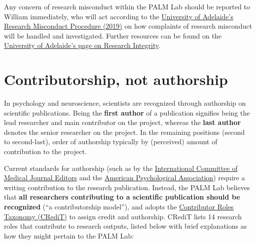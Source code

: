 \documentclass[
]{book}
\begin{document}
Any concern of research misconduct within the PALM Lab should be reported to William immediately, who will act according to the \href{https://www.adelaide.edu.au/policies/96/?dsn=policy.document;field=data;id=7885;m=view}{University of Adelaide's Research Misconduct Procedure (2019)} on how complaints of research misconduct will be handled and investigated. Further resources can be found on the \href{https://www.adelaide.edu.au/staff/research/ethics-compliance-integrity/research-integrity}{University of Adelaide's page on Research Integrity}.

\hypertarget{contributorship}{%
\section{Contributorship, not authorship}\label{contributorship}}

In psychology and neuroscience, scientists are recognized through authorship on scientific publications. Being the \textbf{first author} of a publication signifies being the lead researcher and main contributor on the project, whereas the \textbf{last author} denotes the senior researcher on the project. In the remaining positions (second to second-last), order of authorship typically by (perceived) amount of contribution to the project.

Current standards for authorship (such as by the \href{https://www.icmje.org/recommendations/browse/roles-and-responsibilities/defining-the-role-of-authors-and-contributors.html}{International Committee of Medical Journal Editors} and the \href{https://www.apa.org/research/responsible/publication}{American Psychological Association}) require a writing contribution to the research publication. Instead, the PALM Lab believes that \textbf{all researchers contributing to a scientific publication should be recognized} (``a contributorship model''), and adopts the \href{https://credit.niso.org/}{Contributor Roles Taxonomy (CRediT)} to assign credit and authorship. CRediT lists 14 research roles that contribute to research outputs, listed below with brief explanations as how they might pertain to the PALM Lab:
\end{document}
